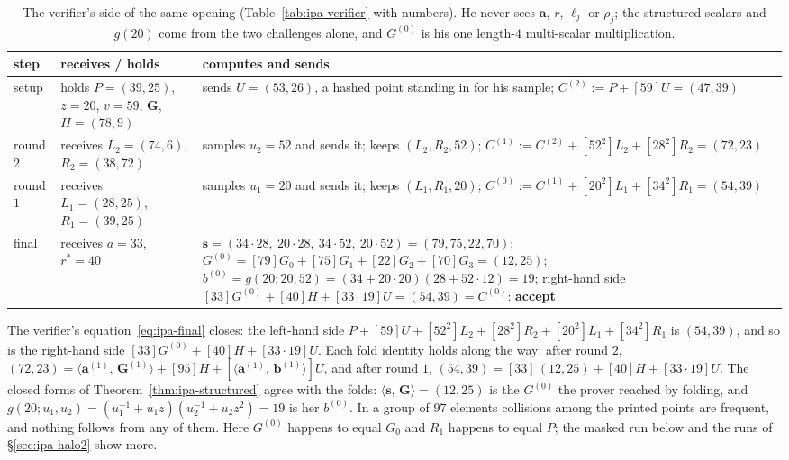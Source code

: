 \documentclass[11pt,a4paper]{article}
\theoremstyle{definition}
\newcommand{\ip}[2]{\langle #1,\, #2 \rangle}
\begin{document}
\begin{table}[htbp]
\centering
\footnotesize
\begin{tabular}{l p{4.6cm} p{7.0cm}}
\toprule
step & receives / holds & computes and sends \\
\midrule
setup
 & holds $P = (39, 25)$, $z = 20$, $v = 59$, $\mathbf G$, $H = (78, 9)$
 & sends $U = (53, 26)$, a hashed point standing in for his sample;
   $C^{(2)} := P + [59]U = (47, 39)$ \\
\addlinespace
round $2$
 & receives $L_2 = (74, 6)$, $R_2 = (38, 72)$
 & samples $u_2 = 52$ and sends it; keeps $(L_2, R_2, 52)$;
   $C^{(1)} := C^{(2)} + [52^{2}]L_2 + [28^{2}]R_2 = (72, 23)$ \\
\addlinespace
round $1$
 & receives $L_1 = (28, 25)$, $R_1 = (39, 25)$
 & samples $u_1 = 20$ and sends it; keeps $(L_1, R_1, 20)$;
   $C^{(0)} := C^{(1)} + [20^{2}]L_1 + [34^{2}]R_1 = (54, 39)$ \\
\addlinespace
final
 & receives $a = 33$, $r^{*} = 40$
 & $\mathbf s = (34\cdot 28,\ 20\cdot 28,\ 34\cdot 52,\ 20\cdot 52)
   = (79, 75, 22, 70)$;
   $G^{(0)} = [79]G_0 + [75]G_1 + [22]G_2 + [70]G_3 = (12, 25)$;
   $b^{(0)} = g(20; 20, 52) = (34 + 20\cdot 20)(28 + 52\cdot 12) = 19$;
   right-hand side $[33]G^{(0)} + [40]H + [33\cdot 19]U = (54, 39)
   = C^{(0)}$: \textbf{accept} \\
\bottomrule
\end{tabular}
\caption{The verifier's side of the same opening
(Table~\ref{tab:ipa-verifier} with numbers). He never sees
$\mathbf a$, $r$, $\ell_j$ or $\rho_j$; the structured scalars and
$g(20)$ come from the two challenges alone, and $G^{(0)}$ is his one
length-$4$ multi-scalar multiplication.}
\label{tab:ipa-toy-verifier}
\end{table}

The verifier's equation~\eqref{eq:ipa-final} closes: the left-hand side
$P + [59]U + [52^{2}]L_2 + [28^{2}]R_2 + [20^{2}]L_1 + [34^{2}]R_1$ is
$(54, 39)$, and so is the right-hand side $[33]G^{(0)} + [40]H +
[33 \cdot 19]U$. Each fold identity holds along the way: after round
$2$, $(72, 23) = \ip{\mathbf a^{(1)}}{\mathbf G^{(1)}} + [95]H +
[\ip{\mathbf a^{(1)}}{\mathbf b^{(1)}}]U$, and after round $1$,
$(54, 39) = [33]\,(12, 25) + [40]H + [33 \cdot 19]U$. The closed forms
of Theorem~\ref{thm:ipa-structured} agree with the folds: $\ip{\mathbf s}
{\mathbf G} = (12, 25)$ is the $G^{(0)}$ the prover reached by folding,
and $g(20; u_1, u_2) = (u_1^{-1} + u_1 z)(u_2^{-1} + u_2 z^{2}) = 19$
is her $b^{(0)}$. In a group of $97$ elements collisions among the
printed points are frequent, and nothing follows from any of them. Here
$G^{(0)}$ happens to equal $G_0$ and $R_1$ happens to equal $P$; the
masked run below and the runs of \S\ref{sec:ipa-halo2} show more.
\end{document}
